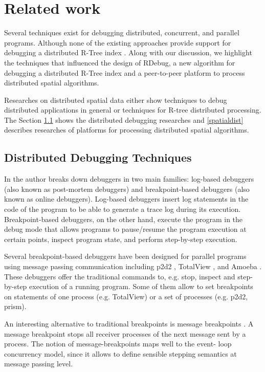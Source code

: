 \section{Related work}
\label{sec:related}

Several techniques exist for debugging distributed, concurrent, and parallel programs. Although none of the existing approaches provide support for debugging a distributed R-Tree index \cite{manolopoulos2003rth,jacox2007spatial}. 
Along with our discussion, we highlight the techniques that influenced the design of RDebug, a new algorithm for debugging a distributed R-Tree index and a peer-to-peer platform to process distributed spatial algorithms.

Researches on distributed spatial data either show techniques to debug distributed applications in general or techniques for R-tree distributed processing. 
The Section \ref{dist_debug} shows the distributed debugging researches and \ref{spatialdist} describes researches of platforms for processing distributed spatial algorithms.
	
\subsection{Distributed Debugging Techniques}
\label{dist_debug}

In \cite{remeD2011} the author breaks down debuggers in two main families: log-based debuggers (also known as post-mortem debuggers) and breakpoint-based debuggers (also known as online debuggers). 
Log-based debuggers insert log statements in the code of the program to be able to generate a trace log during its execution. 
Breakpoint-based debuggers, on the other hand, execute the program in the debug mode that allows programs to pause/resume the program execution at certain points, inspect program state, and perform step-by-step execution. 

Several breakpoint-based debuggers have been designed for parallel programs using message passing communication including p2d2 \cite{p2d21996}, TotalView \cite{totalView2009}, and Amoeba \cite{amoeba1989}. 
These debuggers offer the traditional commands to, e.g. stop, inspect and step-by-step execution of a running program. 
Some of them allow to set breakpoints on statements of one process (e.g. TotalView) or a set of processes (e.g. p2d2, prism). 

An interesting alternative to traditional breakpoints is message breakpoints \cite{debuggingMP1997}. A message breakpoint stops all receiver processes of the next message sent by a process.
The notion of message-breakpoints maps well to the event- loop concurrency model, since it allows to define sensible stepping semantics at message passing level.

